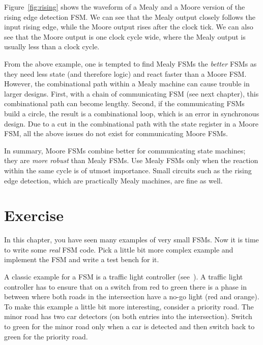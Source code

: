 \documentclass[%
    10pt,
    headinclude, footexclude,
    openright, %
    notitlepage,
    cleardoubleempty,
    headsepline,
    pointlessnumbers,
    bibtotoc, idxtotoc,
    ]{scrbook}
\newcommand{\todo}[1]{{\emph{TODO: #1}}}
\renewcommand{\todo}[1]{}
\begin{document}
Figure~\ref{fig:rising} shows the waveform of a Mealy and a  Moore version
of the rising edge detection FSM. We can see that the Mealy output closely
follows the input rising edge, while the Moore output rises after the clock tick.
We can also see that the Moore output is one clock cycle wide, where the Mealy
output is usually less than a clock cycle.

From the above example, one is tempted to find Mealy FSMs the \emph{better}
FSMs as they need less state (and therefore logic) and react faster than a Moore FSM.
However, the combinational path within a Mealy machine can cause trouble in
larger designs. First, with a chain of communicating FSM (see next chapter), this
combinational path can become lengthy. Second, if the communicating FSMs build
a circle, the result is a combinational loop, which is an error in synchronous design.
Due to a cut in the combinational path with the state register in a Moore FSM,
all the above issues do not exist for communicating Moore FSMs.

In summary, Moore FSMs combine better for communicating state machines; they
are \emph{more robust} than Mealy FSMs. Use Mealy FSMs only when the reaction within the same
cycle is of utmost importance. Small circuits such as the rising edge detection,
which are practically Mealy machines, are fine as well.

\section{Exercise}

In this chapter, you have seen many examples of very small FSMs.
Now it is time to write some \emph{real} FSM code.
Pick a little bit more complex example and implement the FSM and
write a test bench for it.

A classic example for a FSM is a traffic light controller (see~\cite[Section~14.3]{dally:vhdl:2016}).
A traffic light controller has to ensure that on a switch from red to green
there is a phase in between where both roads in the intersection
have a no-go light (red and orange).
To make this example a little bit more interesting, consider a priority road.
The minor road has two car detectors (on both entries into the intersection).
Switch to green for the minor road only when a car is detected and then switch
back to green for the priority road.

\todo{Luca: Greatest common divisor with Euclide algorithm can be also a nice exercise.
Martin: but this is shown at the Chisel homepage without an FSM.}
\end{document}
